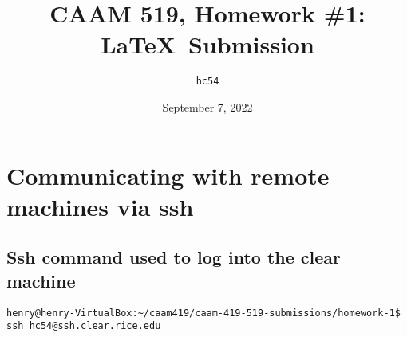 \documentclass[10pt,a4paper]{article}
\title{CAAM 519, Homework \#1: \LaTeX\  Submission}
\author{\texttt{hc54}}
\date{September 7, 2022}
\begin{document}
\maketitle

\section{Communicating with remote machines via ssh}
\subsection{Ssh command used to log into the clear machine}
\begin{verbatim}
henry@henry-VirtualBox:~/caam419/caam-419-519-submissions/homework-1$ ssh hc54@ssh.clear.rice.edu
\end{verbatim}
\end{document}
